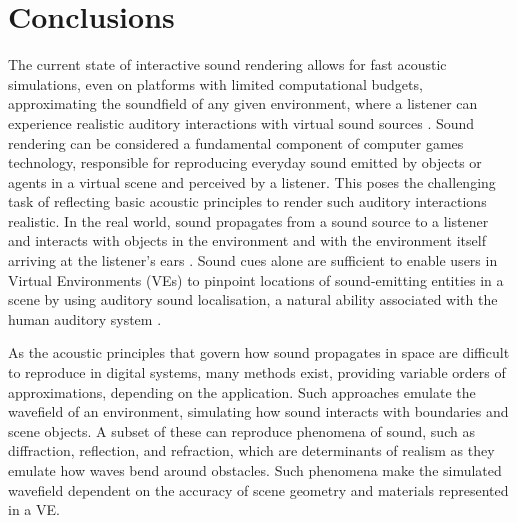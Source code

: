 
\section{Conclusions}
The current state of interactive sound rendering allows for fast acoustic simulations, even on platforms with limited computational budgets, approximating the soundfield of any given environment, where a listener can experience realistic auditory interactions with virtual sound sources \citep{lakka2018spatial, hulusic2012acoustic}. Sound rendering can be considered a fundamental component of computer games technology, responsible for reproducing everyday sound emitted by objects or agents in a virtual scene and perceived by a listener. This poses the challenging task of reflecting basic acoustic principles to render such auditory interactions realistic. In the real world, sound propagates from a sound source to a listener and interacts with objects in the environment and with the environment itself arriving at the listener's ears \citep{kuttruff2016room}. Sound cues alone are sufficient to enable users in Virtual Environments (VEs) to pinpoint locations of sound-emitting entities in a scene by using auditory sound localisation, a natural ability associated with the human auditory system \citep{lokki2005navigation, rubio2017immersive}.\par
As the acoustic principles that govern how sound propagates in space are difficult to reproduce in digital systems, many methods exist, providing variable orders of approximations, depending on the application. Such approaches emulate the wavefield of an environment, simulating how sound interacts with boundaries and scene objects. A subset of these can reproduce phenomena of sound, such as diffraction, reflection, and refraction, which are determinants of realism as they emulate how waves bend around obstacles. Such phenomena make the simulated wavefield dependent on the accuracy of scene geometry and materials represented in a VE. \par
